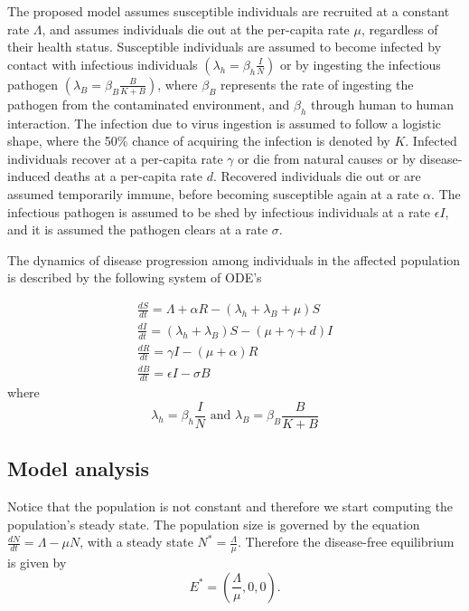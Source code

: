 \documentclass{book}
\begin{document}
The proposed model assumes susceptible individuals are recruited at a constant rate $\Lambda$, and assumes individuals die out at the per-capita rate $\mu$, regardless of their health status. 
%
Susceptible individuals are assumed to become infected by contact with infectious individuals $\left(\lambda_h=\beta_{h}\frac{I}{N}\right)$ or by ingesting the infectious pathogen $\left(\lambda_B=\beta_{B}\frac{B}{K+B} \right)$, where $\beta_B$ represents the rate of ingesting the pathogen from the contaminated environment, and $\beta_h$ through human to human interaction.
%
The infection due to virus ingestion is assumed to follow a logistic shape, where the 50\% chance of acquiring the infection is denoted by $K$.
%
Infected individuals recover at a per-capita rate $\gamma$ or die from natural causes or by disease-induced deaths at a per-capita rate $d$.
%
Recovered individuals die out or are assumed temporarily immune, before becoming susceptible again at a rate $\alpha$.
%
The infectious pathogen is assumed to be shed by infectious individuals at a rate $\epsilon I$, and it is assumed the pathogen clears at a rate $\sigma$.

The dynamics of disease progression among individuals in the affected population is described by the following system of ODE's

\begin{equation}
\begin{array}{l}
\frac{d S}{d t}=\Lambda+\alpha R-\left(\lambda_{h}+\lambda_{B}+\mu\right) S \\
\frac{d I}{d t}=\left(\lambda_{h}+\lambda_{B}\right) S-(\mu+\gamma+d) I \\
\frac{d R}{d t}=\gamma I-(\mu+\alpha) R \\
\frac{d B}{d t}=\epsilon I-\sigma B
\end{array}
\end{equation}
where
\begin{equation}
\lambda_{h} =\beta_{h}\frac{I}{N} \text { and } \lambda_{B} =\beta_{B}\frac{B}{K+B}
\end{equation}

\subsection*{Model analysis}
Notice that the population is not constant and therefore we start computing the population's steady state. The population size is governed by the equation
$\frac{dN}{dt}=\Lambda -\mu N$,
with a steady state $N^*=\frac{\Lambda}{\mu}$.
Therefore the disease-free equilibrium is given by 
\begin{equation}
E^*=\left(\frac{\Lambda}{\mu},0,0 \right).
\end{equation}
\end{document}

